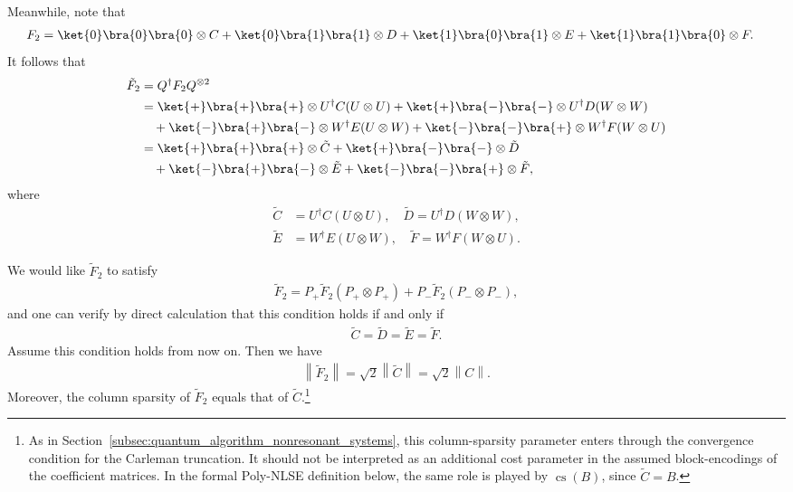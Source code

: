 \documentclass[superscriptaddress,onecolumn,nofootinbib,longbibliography,a4paper,accepted=2026-09-29]{quantumarticle}
\theoremstyle{plain}
\theoremstyle{definition}
\numberwithin{thm}{section}
\numberwithin{assumption}{section}
\numberwithin{lemma}{section}
\numberwithin{prop}{section}
\numberwithin{cor}{section}
\numberwithin{definition}{section}
\numberwithin{rmk}{section}
\numberwithin{equation}{section}
\newcommand{\norm}[1]     {\left\| #1 \right\|}
\begin{document}
Meanwhile, note that
\begin{align}
    F_2&=\ket{0}\bra{0}\bra{0}\otimes C + \ket{0}\bra{1}\bra{1}\otimes D + \ket{1}\bra{0}\bra{1}\otimes E +
    \ket{1}\bra{1}\bra{0}\otimes F.
\end{align}
It follows that
\begin{align}
    \tilde{F}_2&=Q^\dagger F_2 Q^{\otimes 2} \\
    &=\ket{+}\bra{+}\bra{+}\otimes U^\dagger C (U \otimes U)
    + \ket{+}\bra{-}\bra{-}\otimes U^\dagger D (W \otimes W) \\
    &\quad 
    +\ket{-}\bra{+}\bra{-}\otimes W^\dagger E (U \otimes W) 
    + \ket{-}\bra{-}\bra{+}\otimes W^\dagger F (W \otimes U)
    \\
    &=\ket{+}\bra{+}\bra{+}\otimes \tilde{C}
    + \ket{+}\bra{-}\bra{-}\otimes \tilde{D} \\
    &\quad +\ket{-}\bra{+}\bra{-}\otimes \tilde{E} 
    + \ket{-}\bra{-}\bra{+}\otimes \tilde{F}, 
\end{align}
where 
\begin{align}
\tilde{C}&=U^\dagger C (U \otimes U), \quad    
\tilde{D}=U^\dagger D (W \otimes W), \\
\tilde{E}&=W^\dagger E (U \otimes W), \quad
\tilde{F}=W^\dagger F (W \otimes U).
\end{align}

We would like $\tilde{F}_2$ to satisfy 
\begin{align}
    \tilde{F}_2 = P_+ \tilde{F}_2 (P_+\otimes P_+)
    + P_- \tilde{F}_2 (P_-\otimes P_-),
\end{align}
and one can verify by direct calculation that this condition holds if and only if
\begin{align}
  \tilde{C}=\tilde{D}=\tilde{E}=\tilde{F}.  
\end{align}
Assume this condition holds from now on. Then we have
\begin{align}
\norm{\tilde{F}_2}=\sqrt{2}\norm{\tilde{C}}=\sqrt{2}\norm{C}.
\end{align}
Moreover, the column sparsity of $\tilde{F}_2$ equals that of $\tilde{C}$.\footnote{As in Section~\ref{subsec:quantum_algorithm_nonresonant_systems}, this column-sparsity parameter enters through the convergence condition for the Carleman truncation. It should not be interpreted as an additional cost parameter in the assumed block-encodings of the coefficient matrices. In the formal Poly-NLSE definition below, the same role is played by $\operatorname{cs}(B)$, since $\tilde{C}=B$.}
\end{document}
